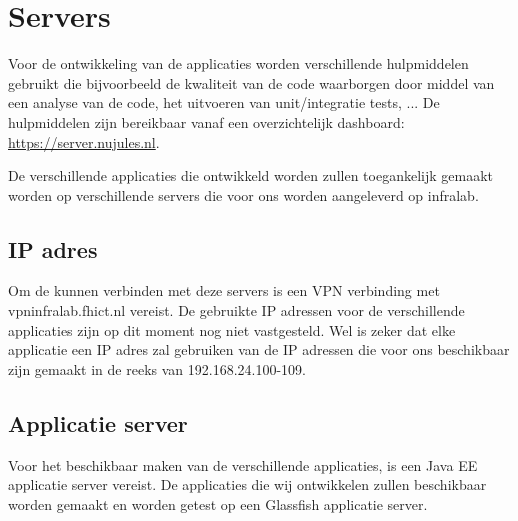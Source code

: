 \section{Servers}
Voor de ontwikkeling van de applicaties worden verschillende hulpmiddelen gebruikt die bijvoorbeeld de kwaliteit van de code waarborgen door middel van een analyse van de code, het uitvoeren van unit/integratie tests, ...
De hulpmiddelen zijn bereikbaar vanaf een overzichtelijk dashboard: \href{https://server.nujules.nl}{https://server.nujules.nl}.

De verschillende applicaties die ontwikkeld worden zullen toegankelijk gemaakt worden op verschillende servers die voor ons worden aangeleverd op infralab.

\subsection{IP adres}

Om de kunnen verbinden met deze servers is een VPN verbinding met vpninfralab.fhict.nl vereist. De gebruikte IP adressen voor de verschillende applicaties zijn op dit moment nog niet vastgesteld. Wel is zeker dat elke applicatie een IP adres zal gebruiken van de IP adressen die voor ons beschikbaar zijn gemaakt in de reeks van 192.168.24.100-109.

\subsection{Applicatie server}
Voor het beschikbaar maken van de verschillende applicaties, is een Java EE applicatie server vereist. De applicaties die wij ontwikkelen zullen beschikbaar worden gemaakt en worden getest op een Glassfish applicatie server.